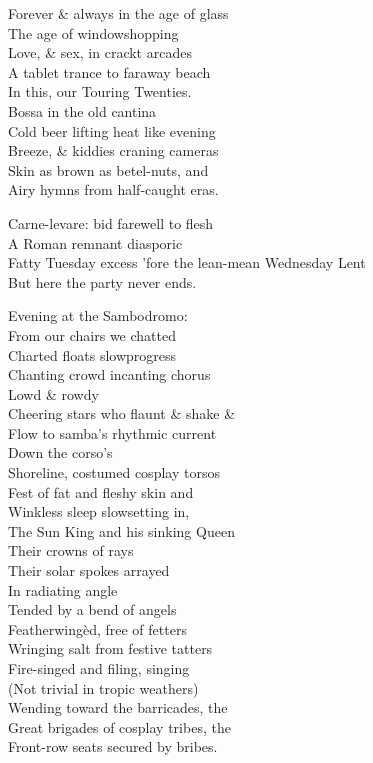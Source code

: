 \secdiv

Forever \& always in the age of glass \\
The age of windowshopping \\
Love, \& sex, in crackt arcades \\
A tablet trance to faraway beach \\
In this, our Touring Twenties. \\

Bossa in the old cantina \\
Cold beer lifting heat like evening \\
Breeze, \& kiddies craning cameras \\
Skin as brown as betel-nuts, and \\
Airy hymns from half-caught eras.

\secdiv

Carne-levare: bid farewell to flesh \\
A Roman remnant diasporic \\
Fatty Tuesday excess 'fore the lean-mean Wednesday Lent \\
But here the party never ends.

Evening at the Sambodromo: \\
From our chairs we chatted \\
Charted floats slowprogress \\
Chanting crowd incanting chorus \\
Lowd \& rowdy \\
Cheering stars who flaunt \& shake \& \\
Flow to samba's rhythmic current \\
Down the corso's \\
Shoreline, costumed cosplay torsos \\
Fest of fat and fleshy skin and \\
Winkless sleep slowsetting in, \\
The Sun King and his sinking Queen \\
Their crowns of rays \\
Their solar spokes arrayed \\
In radiating angle \\
Tended by a bend of angels \\
Featherwingèd, free of fetters \\
Wringing salt from festive tatters \\
Fire-singed and filing, singing \\
(Not trivial in tropic weathers) \\
Wending toward the barricades, the \\
Great brigades of cosplay tribes, the \\
Front-row seats secured by bribes.

